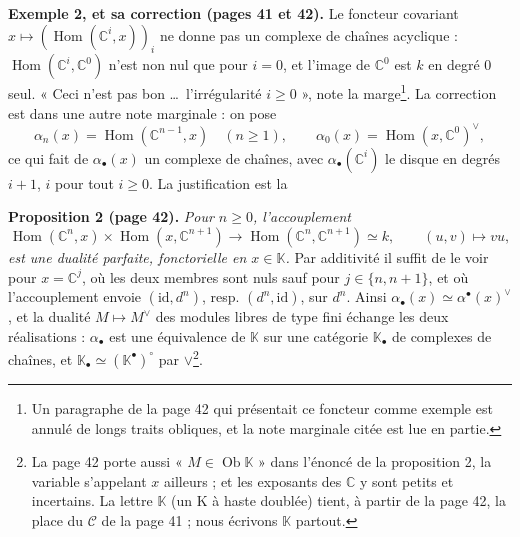 \documentclass[11pt,a4paper]{article}
\begin{document}
\textbf{Exemple 2, et sa correction (pages 41 et 42).} Le foncteur covariant
$x \mapsto (\operatorname{Hom}(\mathbb{C}^{i}, x))_{i}$ ne donne pas un
complexe de chaînes acyclique : $\operatorname{Hom}(\mathbb{C}^{i},
\mathbb{C}^{0})$ n'est non nul que pour $i = 0$, et l'image de
$\mathbb{C}^{0}$ est $k$ en degré $0$ seul. « Ceci n'est pas bon \ldots\
l'irrégularité $i \geqslant 0$ », note la marge\footnote{Un paragraphe de la
page 42 qui présentait ce foncteur comme exemple est annulé de longs traits
obliques, et la note marginale citée est lue en partie.}. La correction est
dans une autre note marginale : on pose
\[
  \alpha_{n}(x) = \operatorname{Hom}(\mathbb{C}^{n-1}, x) \quad (n \geqslant 1),
  \qquad \alpha_{0}(x) = \operatorname{Hom}(x, \mathbb{C}^{0})^{\vee},
\]
ce qui fait de $\alpha_{\bullet}(x)$ un complexe de chaînes, avec
$\alpha_{\bullet}(\mathbb{C}^{i})$ le disque en degrés $i+1$, $i$ pour tout
$i \geqslant 0$. La justification est la

\textbf{Proposition 2 (page 42).} \emph{Pour $n \geqslant 0$, l'accouplement
\[
  \operatorname{Hom}(\mathbb{C}^{n}, x) \times \operatorname{Hom}(x,
  \mathbb{C}^{n+1}) \to \operatorname{Hom}(\mathbb{C}^{n}, \mathbb{C}^{n+1})
  \simeq k, \qquad (u, v) \mapsto vu,
\]
est une dualité parfaite, fonctorielle en $x \in \mathbb{K}$.} Par additivité
il suffit de le voir pour $x = \mathbb{C}^{j}$, où les deux membres sont nuls
sauf pour $j \in \{n, n+1\}$, et où l'accouplement envoie $(\mathrm{id},
d^{n})$, resp. $(d^{n}, \mathrm{id})$, sur $d^{n}$. Ainsi
$\alpha_{\bullet}(x) \simeq \alpha^{\bullet}(x)^{\vee}$, et la dualité
$M \mapsto M^{\vee}$ des modules libres de type fini échange les deux
réalisations : $\alpha_{\bullet}$ est une équivalence de $\mathbb{K}$ sur une
catégorie $\mathbb{K}_{\bullet}$ de complexes de chaînes, et
$\mathbb{K}_{\bullet} \simeq (\mathbb{K}^{\bullet})^{\circ}$ par
$\vee$\footnote{La page 42 porte aussi « $M \in \operatorname{Ob}
\mathbb{K}$ » dans l'énoncé de la proposition 2, la variable s'appelant $x$
ailleurs ; et les exposants des $\mathbb{C}$ y sont petits et incertains.
La lettre $\mathbb{K}$ (un K à haste doublée) tient, à partir de la page 42,
la place du $\mathcal{C}$ de la page 41 ; nous écrivons $\mathbb{K}$
partout.}.
\end{document}

